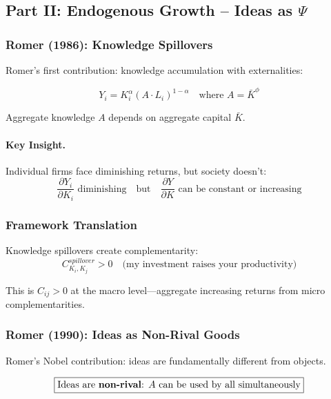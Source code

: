 \subsection{Part II: Endogenous Growth – Ideas as $\Psi$}

\subsubsection{Romer (1986): Knowledge Spillovers}

Romer's first contribution: knowledge accumulation with externalities:

\begin{equation}
\boxed{
Y_i = K_i^\alpha (A \cdot L_i)^{1-\alpha} \quad \text{where } A = \bar{K}^\phi
}
\label{eq:romer86}
\end{equation}

Aggregate knowledge $A$ depends on aggregate capital $\bar{K}$.

\paragraph{Key Insight.}
Individual firms face diminishing returns, but society doesn't:
\begin{equation}
\frac{\partial Y_i}{\partial K_i} \text{ diminishing} \quad \text{but} \quad 
\frac{\partial Y}{\partial K} \text{ can be constant or increasing}
\end{equation}

\subsubsection{Framework Translation}

Knowledge spillovers create complementarity:
\begin{equation}
C_{K_i, K_j}^{spillover} > 0 \quad \text{(my investment raises your productivity)}
\end{equation}

This is $C_{ij} > 0$ at the macro level---aggregate increasing returns from 
micro complementarities.

\subsubsection{Romer (1990): Ideas as Non-Rival Goods}

Romer's Nobel contribution: ideas are fundamentally different from objects.

\begin{equation}
\boxed{
\text{Ideas are \textbf{non-rival}: } A \text{ can be used by all simultaneously}
}
\label{eq:romer90-nonrival}
\end{equation}

